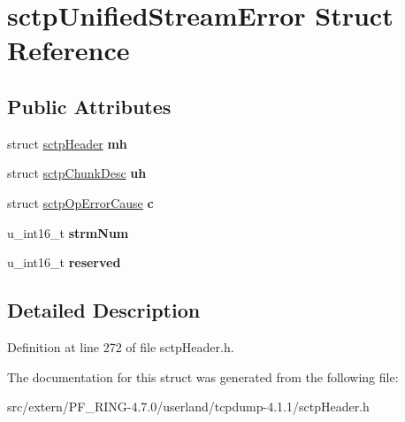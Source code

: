 \hypertarget{structsctp_unified_stream_error}{
\section{sctpUnifiedStreamError Struct Reference}
\label{structsctp_unified_stream_error}
}
\subsection*{Public Attributes}
\begin{DoxyCompactItemize}
\item 
\hypertarget{structsctp_unified_stream_error_af3fa94f13db58b2ecc86322ba71f2bd4}{
struct \hyperlink{structsctp_header}{sctpHeader} {\bfseries mh}}
\label{structsctp_unified_stream_error_af3fa94f13db58b2ecc86322ba71f2bd4}

\item 
\hypertarget{structsctp_unified_stream_error_a3caa3aef524063043365cb450cc48238}{
struct \hyperlink{structsctp_chunk_desc}{sctpChunkDesc} {\bfseries uh}}
\label{structsctp_unified_stream_error_a3caa3aef524063043365cb450cc48238}

\item 
\hypertarget{structsctp_unified_stream_error_afdc2a5dd3c2d3d5db7570a033715c861}{
struct \hyperlink{structsctp_op_error_cause}{sctpOpErrorCause} {\bfseries c}}
\label{structsctp_unified_stream_error_afdc2a5dd3c2d3d5db7570a033715c861}

\item 
\hypertarget{structsctp_unified_stream_error_aad4a968beed2b5b099d9436f4ddebaf5}{
u\_\-int16\_\-t {\bfseries strmNum}}
\label{structsctp_unified_stream_error_aad4a968beed2b5b099d9436f4ddebaf5}

\item 
\hypertarget{structsctp_unified_stream_error_a44221bd7275032537242fb27f92c9a5e}{
u\_\-int16\_\-t {\bfseries reserved}}
\label{structsctp_unified_stream_error_a44221bd7275032537242fb27f92c9a5e}

\end{DoxyCompactItemize}


\subsection{Detailed Description}


Definition at line 272 of file sctpHeader.h.



The documentation for this struct was generated from the following file:\begin{DoxyCompactItemize}
\item 
src/extern/PF\_\-RING-\/4.7.0/userland/tcpdump-\/4.1.1/sctpHeader.h\end{DoxyCompactItemize}
